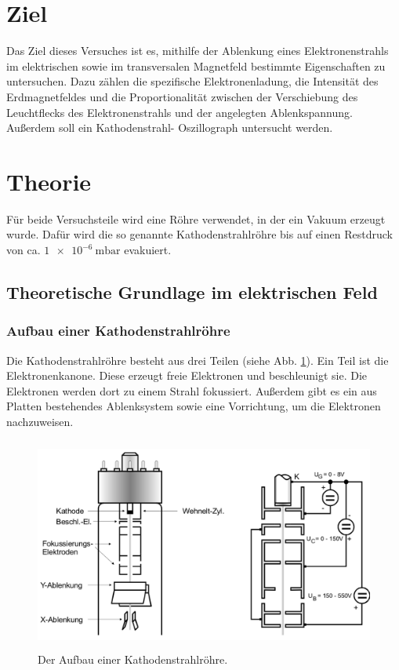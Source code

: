 \section{Ziel}
Das Ziel dieses Versuches ist es, mithilfe der Ablenkung
eines Elektronenstrahls im elektrischen sowie im transversalen
Magnetfeld bestimmte Eigenschaften zu untersuchen.
Dazu zählen die spezifische Elektronenladung, die Intensität
des Erdmagnetfeldes und die Proportionalität zwischen der
Verschiebung des Leuchtflecks des Elektronenstrahls und der
angelegten Ablenkspannung. Außerdem soll ein Kathodenstrahl-
Oszillograph untersucht werden.

\section{Theorie}
\label{sec:Theorie}
Für beide Versuchsteile wird eine Röhre verwendet, in der ein
Vakuum erzeugt wurde. Dafür wird die so genannte Kathodenstrahlröhre 
bis auf einen Restdruck von ca. $\SI{1e-6}{\milli\bar}$
evakuiert. 

\subsection{Theoretische Grundlage im elektrischen Feld}

\subsubsection{Aufbau einer Kathodenstrahlröhre}
Die Kathodenstrahlröhre besteht aus drei 
Teilen (siehe Abb. \ref{fig:roehre}). Ein Teil ist die Elektronenkanone.
Diese erzeugt freie Elektronen und beschleunigt sie.
Die Elektronen werden dort zu einem Strahl fokussiert. 
Außerdem gibt es ein aus Platten bestehendes Ablenksystem
sowie eine Vorrichtung, um die Elektronen nachzuweisen.
\begin{figure}
    \centering
    \includegraphics[width=12cm, height=7cm]{build/roehre.png}
    \caption{Der Aufbau einer Kathodenstrahlröhre. \cite{V501}}
    \label{fig:roehre}
\end{figure}

